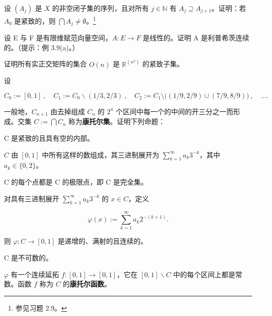 \begin{exercises}
设 $ (A_j) $ 是 $ X $ 的非空闭子集的序列，且对所有 $ j \in \mathbb{N} $ 有 $ A_j \supseteq A_{j+1} $。证明：若 $ A_0 $ 是紧致的，则 $ \bigcap A_j \neq \emptyset $。\footnote{参见习题 2.9。}

\item

设 E 与 F 是有限维赋范向量空间，$ A: E \to F $ 是线性的。证明 A 是利普希茨连续的。（提示：例 3.9(a)。）

\item

证明所有实正交矩阵的集合 $ O(n) $ 是 $ \mathbb{R}^{(n^2)} $ 的紧致子集。

\item

设

\[
C_{0}:=[0,1]~,\quad C_{1}:=C_{0}\backslash(1/3,2/3)~,\quad C_{2}:=C_{1}\setminus\bigl((1/9,2/9)\cup(7/9,8/9)\bigr)~,\quad\ldots.
\]

一般地，$ C_{n+1} $ 由去掉组成 $ C_n $ 的 $ 2^n $ 个区间中每一个的中间的开三分之一而形成。交集 $ C := \bigcap C_n $ 称为\textbf{康托尔集}。证明下列命题：

\begin{items}
\item

C 是紧致的且具有空的内部。

\item

$C$ 由 $[0,1]$ 中所有这样的数组成，其三进制展开为 $\sum_{k=1}^{\infty} a_k 3^{-k}$，其中 $a_k \in \{0,2\}$。

\item

C 的每个点都是 C 的极限点，即 C 是完全集。

\item

对具有三进制展开 $ \sum_{k=1}^{\infty} a_k 3^{-k} $ 的 $ x \in C $，定义

\[
\varphi(x):=\sum_{k=1}^{\infty}a_{k}2^{-(k+1)}.
\]

则 $ \varphi: C \to [0,1] $ 是递增的、满射的且连续的。

\item

C 是不可数的。

\item

$ \varphi $ 有一个连续延拓 $ f:[0,1] \to [0,1] $，它在 $ [0,1]\backslash C $ 中的每个区间上都是常数。函数 $ f $ 称为 $ C $ 的\textbf{康托尔函数}。

\end{items}


\end{exercises}
